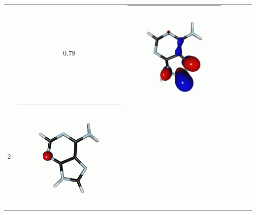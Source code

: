 \documentclass[journal=jctcce,manuscript=article]{achemso}
\begin{document}
\begin{table}[H]
\begin{tabular}{ l | c c c | c c c }
\begin{minipage}{0.2\textwidth}
    \end{minipage}
    & 0.78 & 
    \begin{minipage}{0.2\textwidth}
        \centering
        \includegraphics[scale=0.10]{NTO/Adenine_N/1p_Cs.png}
    \end{minipage}
    \\
        2 &  
    \begin{minipage}{0.2\textwidth}
        \centering
        \includegraphics[scale=0.10]{NTO/Adenine_N/2h_C1.png}

\end{minipage}
\end{tabular}
\end{table}
\end{document}

